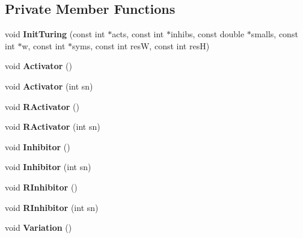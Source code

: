 \subsection*{Private Member Functions}
\begin{DoxyCompactItemize}
\item 
\hypertarget{class_turing_a3c92f7d32056d6dbe46cc791bf4017f7}{void {\bfseries Init\+Turing} (const int $\ast$acts, const int $\ast$inhibs, const double $\ast$smalls, const int $\ast$w, const int $\ast$syms, const int res\+W, const int res\+H)}\label{class_turing_a3c92f7d32056d6dbe46cc791bf4017f7}

\item 
\hypertarget{class_turing_abdd425de86a79b9ab77ad9be6bc04d93}{void {\bfseries Activator} ()}\label{class_turing_abdd425de86a79b9ab77ad9be6bc04d93}

\item 
\hypertarget{class_turing_a5acb322d6c46047cffdd9c0aca7ce6ac}{void {\bfseries Activator} (int sn)}\label{class_turing_a5acb322d6c46047cffdd9c0aca7ce6ac}

\item 
\hypertarget{class_turing_a1f8cebb9cf68695829a0eca44163f757}{void {\bfseries R\+Activator} ()}\label{class_turing_a1f8cebb9cf68695829a0eca44163f757}

\item 
\hypertarget{class_turing_a35dac5d9f68c690f858a3b060a5b1601}{void {\bfseries R\+Activator} (int sn)}\label{class_turing_a35dac5d9f68c690f858a3b060a5b1601}

\item 
\hypertarget{class_turing_a67b5e46fcb5d46409acb6d07beba9314}{void {\bfseries Inhibitor} ()}\label{class_turing_a67b5e46fcb5d46409acb6d07beba9314}

\item 
\hypertarget{class_turing_a2aacf2a14ec4ce1866320d64d256cd50}{void {\bfseries Inhibitor} (int sn)}\label{class_turing_a2aacf2a14ec4ce1866320d64d256cd50}

\item 
\hypertarget{class_turing_a9103be1d136c471795ef83da5121429e}{void {\bfseries R\+Inhibitor} ()}\label{class_turing_a9103be1d136c471795ef83da5121429e}

\item 
\hypertarget{class_turing_aecf355dd19afccb977f32849e734ec3c}{void {\bfseries R\+Inhibitor} (int sn)}\label{class_turing_aecf355dd19afccb977f32849e734ec3c}

\item 
\hypertarget{class_turing_a5d93b9d90eefec044c19ea86b64905cb}{void {\bfseries Variation} ()}\label{class_turing_a5d93b9d90eefec044c19ea86b64905cb}


\end{DoxyCompactItemize}

